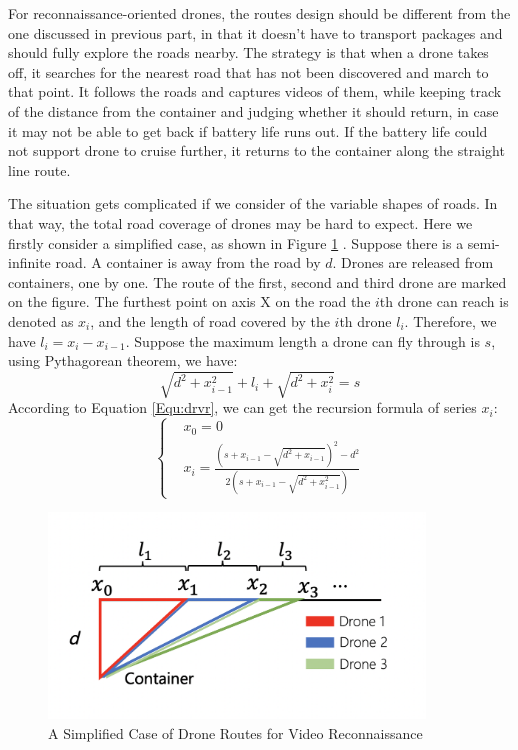\documentclass{mcmthesis}
\begin{document}
For reconnaissance-oriented drones, the routes design should be different from the one discussed in previous part, in that it doesn't have to transport packages and should fully explore the roads nearby. The strategy is that when a drone takes off, it searches for the nearest road that has not been discovered and march to that point. It follows the roads and captures videos of them, while keeping track of the distance from the container and judging whether it should return, in case it may not be able to get back if battery life runs out. If the battery life could not support drone to cruise further, it returns to the container along the straight line route.

The situation gets complicated if we consider of the variable shapes of roads. In that way, the total road coverage of drones may be hard to expect. Here we firstly consider a simplified case, as shown in Figure \ref{Fig:vdsr} . Suppose there is a semi-infinite road. A container is away from the road by $d$. Drones are released from containers, one by one. The route of the first, second and third drone are marked on the figure. The furthest point on axis X on the road the $i$th drone can reach is denoted as $x_i$, and the length of road covered by the $i$th drone $l_i$. Therefore, we have $l_i=x_i-x_{i-1}$. Suppose the maximum length a drone can fly through is $s$, using Pythagorean theorem, we have:
\begin{equation}
    \sqrt{d^2+x_{i-1}^2} + l_i + \sqrt{d^2+x_i^2} = s
    \label{Equ:drvr}
\end{equation}
According to Equation \ref{Equ:drvr}, we can get the recursion formula of series $x_i$:
\begin{equation}
    \left\{
    \begin{aligned}
    &x_0 = 0 \\
    &x_i = \frac{(s + x_{i-1} - \sqrt{d^2 + x_{i-1}})^2 - d^2}{2(s + x_{i-1} - \sqrt{d^2 + x_{i-1}^2})}
    \end{aligned}
    \right.
\end{equation}

\begin{figure}[htbp]
    \centering
    \includegraphics[width=10cm]{figures/video_drone_path.png}
    \caption{A Simplified Case of Drone Routes for Video Reconnaissance}
    \label{Fig:vdsr}
\end{figure}
\end{document}
